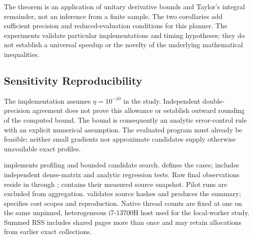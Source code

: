 The theorem is an application of unitary derivative bounds and Taylor's integral remainder, not an inference from a finite sample. The two corollaries add sufficient precision and reduced-evaluation conditions for this planner. The experiments validate particular implementations and timing hypotheses; they do not establish a universal speedup or the novelty of the underlying mathematical inequalities.

\subsection{Sensitivity Reproducibility}

The implementation assumes $\eta=10^{-10}$ in the study. Independent double-precision agreement does not prove this allowance or establish outward rounding of the computed bound. The bound is consequently an analytic error-control rule with an explicit numerical assumption. The evaluated program must already be feasible; neither small gradients nor approximate candidates supply otherwise unavailable exact profiles.

 implements profiling and bounded candidate search.  defines the cases;  includes independent dense-matrix and analytic regression tests. Raw final observations reside in  through ;  contains their measured source snapshot. Pilot runs are excluded from aggregation.  validates source hashes and produces the summary;  specifies cost scopes and reproduction. Native thread counts are fixed at one on the same unpinned, heterogeneous i7-13700H host used for the local-worker study. Summed RSS includes shared pages more than once and may retain allocations from earlier exact collections.
